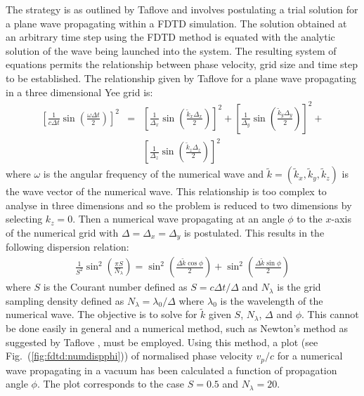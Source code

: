 \documentclass[a4paper, 12pt]{article}
\newcommand{\rfig}[1]{Fig.\ (\ref{#1})}
\begin{document}
	The strategy is as outlined by Taflove \cite{taflove00book} and
	involves postulating a trial solution for a plane wave propagating
	within a FDTD simulation. The solution obtained at an arbitrary time
	step using the FDTD method is equated with the analytic solution of
	the wave being launched into the system. The resulting system of
	equations permits the relationship between phase velocity, grid size
	and time step to be established. The relationship given by Taflove
	\cite{taflove00book} for a plane wave propagating in a three
	dimensional Yee grid is:
	\begin{eqnarray}
		\left[\frac{1}{c\Delta t}\sin\left(\frac{\omega\Delta
			t}{2}\right)\right]^2 &=& \left[\frac{1}{\Delta_x}\sin\left(\frac{\tilde{k}_x\Delta_x}{2}\right)\right]^2+\left[\frac{1}{\Delta_y}\sin\left(\frac{\tilde{k}_y\Delta_y}{2}\right)\right]^2+\nonumber\\&&\left[\frac{1}{\Delta_z}\sin\left(\frac{\tilde{k}_z\Delta_z}{2}\right)\right]^2
		\label{eq:fdtd:numdisp1}
	\end{eqnarray}
	where $\omega$ is the angular frequency of the numerical wave and
	$\tilde{k}=(\tilde{k}_x,\tilde{k}_y,\tilde{k}_z)$ is the wave vector
	of the numerical wave. This relationship is too complex to analyse in
	three dimensions and so the problem is reduced to two dimensions by
	selecting $k_z=0$. Then a numerical wave propagating at an angle
	$\phi$ to the $x$-axis of the numerical grid with
	$\Delta=\Delta_x=\Delta_y$ is postulated. This
	results in the following dispersion relation:
	\begin{eqnarray}
		\frac{1}{S^2}\sin^2\left(\frac{\pi
			S}{N_\lambda}\right)=\sin^2\left(\frac{\Delta\tilde{k}\cos\phi}{2}\right)
		+ \sin^2\left(\frac{\Delta \tilde{k}\sin\phi}{2}\right)
		\label{eq:fdtd:numdisp2}
	\end{eqnarray}
	where $S$ is the Courant number defined as $S=c\Delta t/\Delta$ and
	$N_\lambda$ is the grid sampling density defined as
	$N_\lambda=\lambda_0/\Delta$ where $\lambda_0$ is the wavelength of
	the numerical wave. The objective is to solve for $\tilde{k}$ given
	$S$, $N_\lambda$, $\Delta$ and $\phi$. This cannot be done easily in
	general and a numerical method, such as Newton's method as suggested
	by Taflove \cite{taflove00book}, must be employed. Using this method,
	a plot (see \rfig{fig:fdtd:numdispphi}) of normalised phase velocity $v_p/c$ for a numerical wave
	propagating in a vacuum has been calculated a function of propagation
	angle $\phi$. The plot corresponds to the case $S=0.5$ and
	$N_\lambda=20$.
\end{document}
